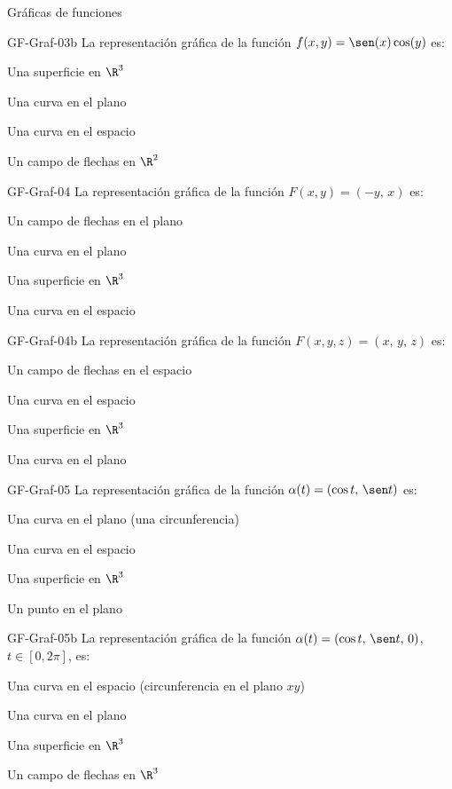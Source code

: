 \documentclass[a4,11pt]{aleph-notas}
\begin{document}
\begin{quiz}{Gráficas de funciones}
\begin{multi}[]%
    {GF-Graf-03b}
    La representación gráfica de la función $f(x,y)=\sen(x)\cos(y)$ es:
    \item* Una superficie en $\R^3$
    \item Una curva en el plano
    \item Una curva en el espacio
    \item Un campo de flechas en $\R^2$
\end{multi}

\begin{multi}[]%
    {GF-Graf-04}
    La representación gráfica de la función $F(x,y)=(-y,\, x)$ es:
    \item* Un campo de flechas en el plano
    \item Una curva en el plano
    \item Una superficie en $\R^3$
    \item Una curva en el espacio
\end{multi}

\begin{multi}[]%
    {GF-Graf-04b}
    La representación gráfica de la función $F(x,y,z)=(x,\, y,\, z)$ es:
    \item* Un campo de flechas en el espacio
    \item Una curva en el espacio
    \item Una superficie en $\R^3$
    \item Una curva en el plano
\end{multi}

\begin{multi}[]%
    {GF-Graf-05}
    La representación gráfica de la función $\alpha(t)=(\cos t,\, \sen t)$ es:
    \item* Una curva en el plano (una circunferencia)
    \item Una curva en el espacio
    \item Una superficie en $\R^3$
    \item Un punto en el plano
\end{multi}

\begin{multi}[]%
    {GF-Graf-05b}
    La representación gráfica de la función $\alpha(t)=(\cos t,\, \sen t,\, 0)$, $t\in[0,2\pi]$, es:
    \item* Una curva en el espacio (circunferencia en el plano $xy$)
    \item Una curva en el plano
    \item Una superficie en $\R^3$
    \item Un campo de flechas en $\R^3$
\end{multi}

\end{quiz}
\end{document}
